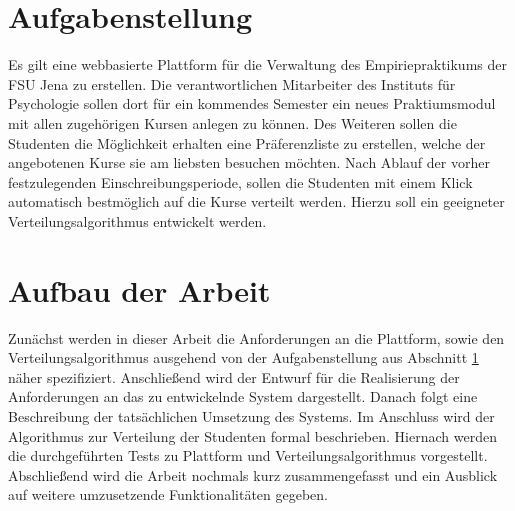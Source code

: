    \section{Aufgabenstellung}
    \label{sec:task}
        Es gilt eine webbasierte Plattform für die Verwaltung des Empiriepraktikums der FSU Jena zu erstellen.
		Die verantwortlichen Mitarbeiter des Instituts für Psychologie sollen dort für ein kommendes Semester ein neues Praktiumsmodul mit allen zugehörigen Kursen anlegen zu können.
        Des Weiteren sollen die Studenten die Möglichkeit erhalten eine Präferenzliste zu erstellen, welche der angebotenen Kurse sie am liebsten besuchen möchten.
        Nach Ablauf der vorher festzulegenden Einschreibungsperiode, sollen die Studenten mit einem Klick automatisch bestmöglich auf die Kurse verteilt werden.
        Hierzu soll ein geeigneter Verteilungsalgorithmus entwickelt werden.


    \section{Aufbau der Arbeit}
    \label{sec:structure}
       Zunächst werden in dieser Arbeit die Anforderungen an die Plattform, sowie den Verteilungsalgorithmus ausgehend von der Aufgabenstellung aus Abschnitt \ref{sec:task} näher spezifiziert.
       Anschließend wird der Entwurf für die Realisierung der Anforderungen an das zu entwickelnde System dargestellt.
       Danach folgt eine Beschreibung der tatsächlichen Umsetzung des Systems.
       Im Anschluss wird der Algorithmus zur Verteilung der Studenten formal beschrieben.
       Hiernach werden die durchgeführten Tests zu Plattform und Verteilungsalgorithmus vorgestellt.
       Abschließend wird die Arbeit nochmals kurz zusammengefasst und ein Ausblick auf weitere umzusetzende Funktionalitäten gegeben.
       